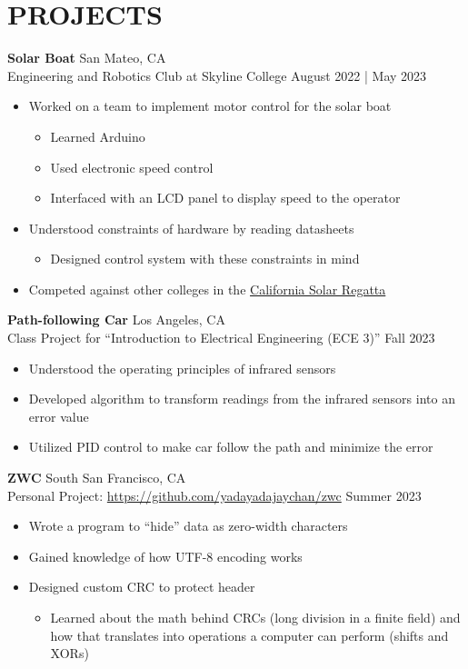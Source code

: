 \documentclass[letterpaper,9pt]{extarticle}
\begin{document}
\section*{PROJECTS}
\noindent
\textbf{Solar Boat} \hfill San Mateo, CA\\ %
Engineering and Robotics Club at Skyline College \hfill August 2022 | May 2023 %
\begin{itemize}
	\item Worked on a team to implement motor control for the solar boat
	\begin{itemize}
		\item Learned Arduino
		\item Used electronic speed control
		\item Interfaced with an LCD panel to display speed to the operator
	\end{itemize}
	\item Understood constraints of hardware by reading datasheets
	\begin{itemize}
		\item Designed control system with these constraints in mind
	\end{itemize}
	\item Competed against other colleges in the
		\href{https://www.smud.org/en/In-Our-Community/Workshops-and-education-resources/Teachers-and-students/Solar-Regatta}{California Solar Regatta}
\end{itemize}

\noindent
\textbf{Path-following Car} \hfill Los Angeles, CA\\ %
Class Project for ``Introduction to Electrical Engineering (ECE 3)'' \hfill Fall 2023
\begin{itemize}
	\item Understood the operating principles of infrared sensors
	\item Developed algorithm to transform readings from the infrared sensors into an error value
	\item Utilized PID control to make car follow the path and minimize the error
\end{itemize}

\noindent
\textbf{ZWC} \hfill South San Francisco, CA\\
Personal Project: \url{https://github.com/yadayadajaychan/zwc} \hfill Summer 2023
\begin{itemize}
	\item Wrote a program to ``hide'' data as zero-width characters
	\item Gained knowledge of how UTF-8 encoding works
	\item Designed custom CRC to protect header
	\begin{itemize}
		\item Learned about the math behind CRCs (long division in a finite field)
			and how that translates into operations a computer can perform (shifts and XORs)
	\end{itemize}
\end{itemize}
\end{document}
